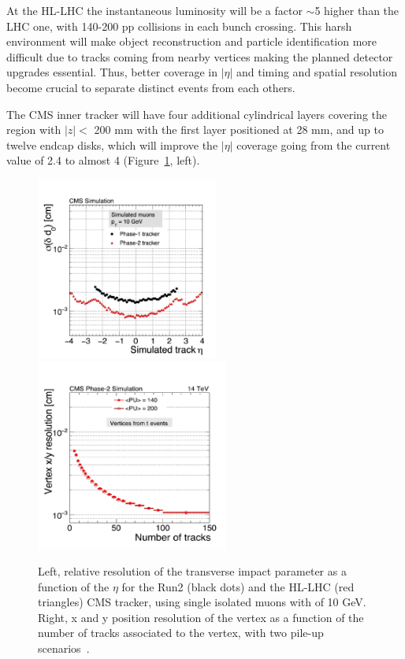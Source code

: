 At the HL-LHC the
instantaneous luminosity will be a factor $\sim$5 higher than the LHC
one, with 140-200 pp collisions in each bunch crossing. This harsh
environment will make object reconstruction and particle
identification more difficult due to tracks coming from nearby
vertices making the planned detector upgrades essential. Thus, better coverage in $|\eta|$ and timing and spatial
resolution become crucial to
separate distinct events from each others. 


The CMS inner tracker will have four additional cylindrical 
layers covering the region with $|z| < $ 200 mm with the first layer positioned at
28 mm, and up to twelve endcap
disks, which will improve the $|\eta|$ coverage going from the current
value of 2.4 to almost 4 (Figure~\ref{fig:MDT_alimena}, left).
\begin{figure}[h!]
\centering
    \includegraphics[clip,trim=0.5cm 0cm 0.cm 1.8cm, height =6cm]{Figures/c7/IPrel.pdf}
    \includegraphics[clip,trim=0.5cm 0cm 0.cm 1.3cm, height = 6.3cm]{Figures/c7/vertexrel.pdf}
\caption{Left, relative resolution of the transverse impact
parameter as a function of the $\eta$ for the Run2 (black dots) and the
HL-LHC (red triangles) CMS tracker, using single isolated muons with
\pt of 10 GeV. Right, x and y position resolution of the vertex as a function of the
number of tracks associated to the vertex, with two pile-up scenarios~\cite{Alimena_2020}.}
\label{fig:MDT_alimena}
\end{figure}


